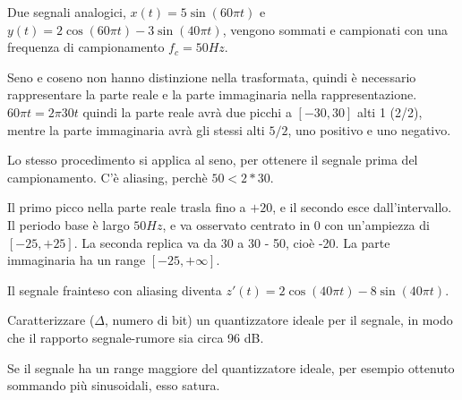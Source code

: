 Due segnali analogici, $x(t) = 5\sin(60\pi t)$ e $y(t) = 2\cos(60\pi t) - 3\sin(40\pi t)$, vengono sommati e campionati con una frequenza di campionamento $f_c = 50 Hz$. 

Seno e coseno non hanno distinzione nella trasformata, quindi è necessario rappresentare la parte reale e la parte immaginaria nella rappresentazione. 
$60\pi t = 2\pi 30t$ quindi la parte reale avrà due picchi a $[-30, 30]$ alti 1 (2/2), mentre la parte immaginaria avrà gli stessi alti $5 / 2$, uno positivo e uno negativo.

Lo stesso procedimento si applica al seno, per ottenere il segnale prima del campionamento. C'è aliasing, perchè $50 < 2 * 30$. 

Il primo picco nella parte reale trasla fino a $+20$, e il secondo esce dall'intervallo. Il periodo base è largo $50 Hz$, e va osservato centrato in 0 con un'ampiezza di $[-25, +25]$. La seconda replica va da 30 a 30 - 50, cioè -20. La parte immaginaria ha un range $[-25, +\infty]$.

Il segnale frainteso con aliasing diventa $z'(t) = 2\cos(40\pi t) - 8\sin(40\pi t)$.

Caratterizzare ($\Delta$, numero di bit) un quantizzatore ideale per il segnale, in modo che il rapporto segnale-rumore sia circa 96 dB.

Se il segnale ha un range maggiore del quantizzatore ideale, per esempio ottenuto sommando più sinusoidali, esso satura.
